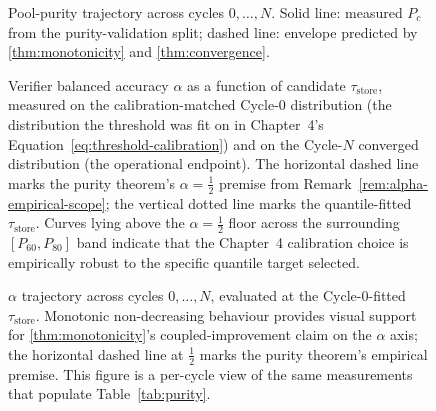 \begin{figure}[t]
\centering
{}
\caption{Pool-purity trajectory across cycles $0,\ldots,N$.
Solid line: measured $P_c$ from the purity-validation split; dashed
line: envelope predicted by \cref{thm:monotonicity} and
\cref{thm:convergence}.}
\label{fig:purity-trajectory}
\end{figure}

\begin{figure}[t]
\centering
{}
\caption{Verifier balanced accuracy $\alpha$ as a function of candidate
$\tau_{\text{store}}$, measured on the calibration-matched Cycle-0
distribution (the distribution the threshold was fit on in
Chapter~4's Equation~\ref{eq:threshold-calibration}) and on the
Cycle-$N$ converged distribution (the operational endpoint).
The horizontal dashed line marks the purity theorem's
$\alpha = \tfrac{1}{2}$ premise from
Remark~\ref{rem:alpha-empirical-scope}; the vertical dotted line
marks the quantile-fitted $\tau_{\text{store}}$. Curves lying above
the $\alpha = \tfrac{1}{2}$ floor across the surrounding
$[P_{60}, P_{80}]$ band indicate that the Chapter~4 calibration
choice is empirically robust to the specific quantile target
selected.}
\label{fig:alpha-vs-tau}
\end{figure}

\begin{figure}[t]
\centering
{}
\caption{$\alpha$ trajectory across cycles $0, \ldots, N$, evaluated
at the Cycle-0-fitted $\tau_{\text{store}}$. Monotonic non-decreasing
behaviour provides visual support for \cref{thm:monotonicity}'s
coupled-improvement claim on the $\alpha$ axis; the horizontal dashed
line at $\tfrac{1}{2}$ marks the purity theorem's empirical premise.
This figure is a per-cycle view of the same measurements that
populate Table~\ref{tab:purity}.}
\label{fig:alpha-trajectory}
\end{figure}

